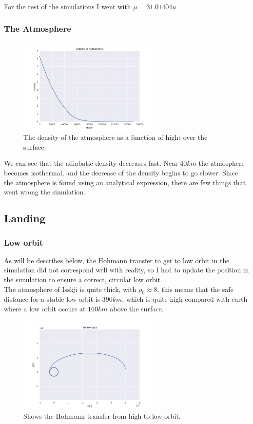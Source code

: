 \documentclass[a4paper, 10pt]{article}
\begin{document}
For the rest of the simulations I went with $\mu = 31.01404 u$

\subsubsection{The Atmosphere}

\begin{figure}[H]
\centering
\includegraphics[width = 70mm]{part6atmos.png}
\caption{The density of the atmosphere as a function of hight over the surface.}
\end{figure}

We can see that the adiabatic density decreases fast. Near $40 km$ the atmosphere becomes isothermal, and the decrease of the density begins to go slower. Since the atmosphere is found using an analytical expression, there are few things that went wrong the simulation.

\subsection{Landing}
\subsubsection{Low orbit}
As will be describes below, the Hohmann transfer to get to low orbit in the simulation did not correspond well with reality, so I had to update the position in the simulation to ensure a correct, circular low orbit.\\

The atmosphere of Isskji is quite thick, with $\rho_0 \approx 8$, this means that the safe distance for a stable low orbit is $390 km$, which is quite high compared with earth where a low orbit occurs at $160 km$ above the surface.\\

\begin{figure}[H]
\centering
\includegraphics[width = 70mm]{part6orb.png}
\caption{Shows the Hohmann transfer from high to low orbit.}
\end{figure}
\end{document}
